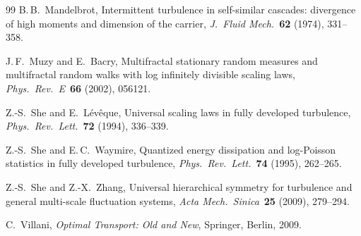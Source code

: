 \documentclass[12pt]{amsart}
\theoremstyle{definition}
\theoremstyle{remark}
\begin{document}
\begin{thebibliography}{99}
B.\,B.\ Mandelbrot,
Intermittent turbulence in self-similar cascades: divergence of high
moments and dimension of the carrier,
\textit{J.\ Fluid Mech.}\ \textbf{62} (1974), 331--358.

J.\,F.\ Muzy and E.\ Bacry,
Multifractal stationary random measures and multifractal random
walks with log infinitely divisible scaling laws,
\textit{Phys.\ Rev.\ E}\ \textbf{66} (2002), 056121.

Z.-S.\ She and E.\ L\'ev\^eque,
Universal scaling laws in fully developed turbulence,
\textit{Phys.\ Rev.\ Lett.}\ \textbf{72} (1994), 336--339.

Z.-S.\ She and E.\,C.\ Waymire,
Quantized energy dissipation and log-Poisson statistics in fully
developed turbulence,
\textit{Phys.\ Rev.\ Lett.}\ \textbf{74} (1995), 262--265.

Z.-S.\ She and Z.-X.\ Zhang,
Universal hierarchical symmetry for turbulence and general multi-scale
fluctuation systems,
\textit{Acta Mech.\ Sinica}\ \textbf{25} (2009), 279--294.

C.\ Villani,
\textit{Optimal Transport: Old and New},
Springer, Berlin, 2009.

\end{thebibliography}
\end{document}
